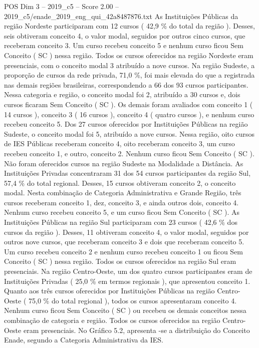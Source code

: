 \begin{textsample}{POS Dim 3 – 2019\_c5 – Score 2.00 – 2019\_c5/enade\_2019\_eng\_qui\_42a8487876.txt}
As Instituições Públicas da região Nordeste participaram com 12 cursos ( 42,9 \% do total da região ).
Desses, seis obtiveram conceito 4, o valor modal, seguidos por outros cinco cursos, que receberam conceito 3.
Um curso recebeu conceito 5 e nenhum curso ficou Sem Conceito ( SC ) nessa região.
Todos os cursos oferecidos na região Nordeste eram presenciais, com o conceito modal 3 atribuído a nove cursos.
Na região Sudeste, a proporção de cursos da rede privada, 71,0 \%, foi mais elevada do que a registrada nas demais regiões brasileiras, correspondendo a 66 dos 93 cursos participantes.
Nessa categoria e região, o conceito modal foi 2, atribuído a 30 cursos e, dois cursos ficaram Sem Conceito ( SC ).
Os demais foram avaliados com conceito 1 ( 14 cursos ), conceito 3 ( 16 cursos ), conceito 4 ( quatro cursos ), e nenhum curso recebeu conceito 5.
Dos 27 cursos oferecidos por Instituições Públicas na região Sudeste, o conceito modal foi 5, atribuído a nove cursos.
Nessa região, oito cursos de IES Públicas receberam conceito 4, oito receberam conceito 3, um curso recebeu conceito 1, e outro, conceito 2.
Nenhum curso ficou Sem Conceito ( SC ).
Não foram oferecidos cursos na região Sudeste na Modalidade a Distância.
As Instituições Privadas concentraram 31 dos 54 cursos participantes da região Sul, 57,4 \% do total regional.
Desses, 15 cursos obtiveram conceito 2, o conceito modal.
Nesta combinação de Categoria Administrativa e Grande Região, três cursos receberam conceito 1, dez, conceito 3, e ainda outros dois, conceito 4.
Nenhum curso recebeu conceito 5, e um curso ficou Sem Conceito ( SC ).
As Instituições Públicas na região Sul participaram com 23 cursos ( 42,6 \% dos cursos da região ).
Desses, 11 obtiveram conceito 4, o valor modal, seguidos por outros nove cursos, que receberam conceito 3 e dois que receberam conceito 5.
Um curso recebeu conceito 2 e nenhum curso recebeu conceito 1 ou ficou Sem Conceito ( SC ) nessa região.
Todos os cursos oferecidos na região Sul eram presenciais.
Na região Centro-Oeste, um dos quatro cursos participantes eram de Instituições Privadas ( 25,0 \% em termos regionais ), que apresentou conceito 1.
Quanto aos três cursos oferecidos por Instituições Públicas na região Centro-Oeste ( 75,0 \% do total regional ), todos os cursos apresentaram conceito 4.
Nenhum curso ficou Sem Conceito ( SC ) ou recebeu os demais conceitos nessa combinação de categoria e região.
Todos os cursos oferecidos na região Centro-Oeste eram presenciais.
No Gráfico 5.2, apresenta -se a distribuição do Conceito Enade, segundo a Categoria Administrativa da IES.

\end{textsample}
